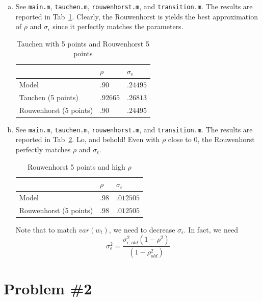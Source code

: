 \documentclass[12pt]{article}
\newcommand{\1}{{\bf 1}} %
\begin{document}
\begin{enumerate}[(a)]
\item
See \texttt{main.m}, \texttt{tauchen.m}, \texttt{rouwenhorst.m}, and \texttt{transition.m}. The results are reported in Tab~\ref{tab:tab2}. Clearly, the Rouwenhorst is yields the best approximation of $\rho$ and $\sigma_\epsilon$ since it perfectly matches the parameters.
\begin{table}[H]
	\centering
	\label{tab:tab2}
	\begin{tabular}{@{}lll@{}}
		\toprule
		& $\rho$   & $\sigma_{\epsilon}$ \\ \midrule
		Model               & $.90$     & $.24495$            \\
		Tauchen (5 points)  & $.92665$ & $.26813$            \\
		Rouwenhorst (5 points) & $.90$ & $.24495$            \\ \bottomrule
	\end{tabular}
	\caption{Tauchen with 5 points and Rouwenhorst 5 points}
\end{table}

\item
See \texttt{main.m}, \texttt{tauchen.m}, \texttt{rouwenhorst.m}, and \texttt{transition.m}. The results are reported in Tab~\ref{tab:tab3}. Lo, and behold! Even with $\rho$ close to $0$, the Rouwenhorst perfectly matches $\rho$ and $\sigma_\epsilon$.

\begin{table}[H]
	\centering
	\label{tab:tab3}
	\begin{tabular}{@{}lll@{}}
		\toprule
		& $\rho$   & $\sigma_{\epsilon}$ \\ \midrule
		Model               & $.98$     & $.012505$            \\
		Rouwenhorst (5 points) & $.98$ & $.012505$            \\ \bottomrule
	\end{tabular}
	\caption{Rouwenhorst 5 points and high $\rho$}
\end{table}

 Note that to match $var(w_t)$, we need to decrease $\sigma_\epsilon$. In fact, we need
\[
\sigma_\epsilon^2 = \frac{\sigma_{\epsilon,old}^2(1-\rho^2)}{(1-\rho^2_{old})}
\]

\end{enumerate}
\section*{Problem \#2}
\end{document}
